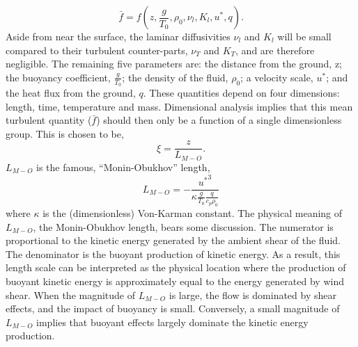 \begin{equation}
\bar f = f(z,\frac{g}{T_0},\rho_0,\nu_l,K_l,u^*,q).
\end{equation}
Aside from near the surface, the laminar diffusivities $\nu_l$ and $K_l$ will be
 small compared to their turbulent counter-parts, $\nu_T$ and $K_T$, and
 are therefore negligible. 
The remaining five parameters are: the distance from the ground, z; the
buoyancy coefficient, $\frac{g}{T_0}$; the density of the fluid,
$\rho_0$; a velocity scale, $u^*$; and the heat flux from the ground,
$q$. 
%
% 
These quantities depend on four dimensions: length, time, temperature
and mass. Dimensional analysis implies that this mean turbulent quantity
($\bar f$) should then only be a function of a single dimensionless
group\cite{munson2012fundamentals}. This is chosen to be,
\begin{equation}
 \xi = \frac{z}{L_{M-O}}.
\end{equation}
$L_{M-O}$ is the famous, ``Monin-Obukhov'' length,
\begin{equation}
 L_{M-O} = -\frac{{u^*}^3}{\kappa \frac{g}{T_0} \frac{q}{c_p \rho_0}}
\end{equation}
where $\kappa$ is the (dimensionless) Von-Karman constant. 
The physical meaning of $L_{M-O}$, the Monin-Obukhov length, bears some discussion. 
The numerator is proportional to the kinetic energy generated by the ambient 
shear of the fluid. The denominator is the buoyant production of kinetic energy. 
As a result, this length scale can be interpreted as the physical location where the
production of buoyant kinetic energy is approximately equal to the energy generated 
by wind shear. When the magnitude of $L_{M-O}$ is large, the flow is dominated
by shear effects, and the impact of buoyancy is small. Conversely, a small 
magnitude of $L_{M-O}$ implies that buoyant effects largely dominate the kinetic energy production.

